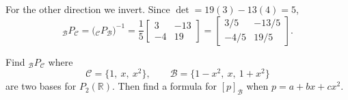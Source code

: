 \begin{example}
\begin{solution}
For the other direction we invert. Since $\det = 19(3) - 13(4) = 5$,
\[
{}_{\mathcal{B}}P_{\mathcal{C}} = \bigl({}_{\mathcal{C}}P_{\mathcal{B}}\bigr)^{-1}
= \frac{1}{5}\begin{bmatrix} 3 & -13 \\ -4 & 19 \end{bmatrix}
= \begin{bmatrix} 3/5 & -13/5 \\ -4/5 & 19/5 \end{bmatrix}.
\]
\end{solution}
\end{example}

\begin{example}
Find ${}_{\mathcal{B}}P_{\mathcal{C}}$ where
\[
\mathcal{C} = \{1, \ x, \ x^2\}, \qquad \mathcal{B} = \{1 - x^2, \ x, \ 1 + x^2\}
\]
are two bases for $P_2(\mathbb{R})$. Then find a formula for $[p]_{\mathcal{B}}$ when $p = a + bx + cx^2$.


\end{example}
